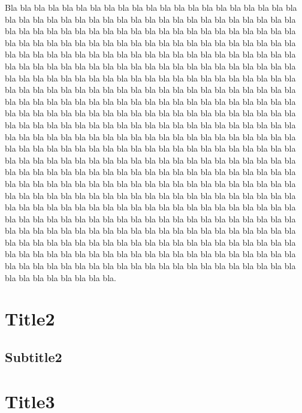 \documentclass{uimppracticas}
\begin{document}
Bla bla bla bla bla bla bla bla bla bla bla bla bla bla bla bla bla bla bla bla bla bla bla bla bla bla bla bla bla bla bla bla bla bla bla bla bla bla bla bla bla bla bla bla bla bla bla bla bla bla bla bla bla bla bla bla bla bla bla bla bla bla bla bla bla bla bla bla bla bla bla bla bla bla bla bla bla bla bla bla bla bla bla bla bla bla bla bla bla bla bla bla bla bla bla bla bla bla bla bla bla bla bla bla bla bla bla bla bla bla bla bla bla bla bla bla bla bla bla bla bla bla bla bla bla bla bla bla bla bla bla bla bla bla bla bla bla bla bla bla bla bla bla bla bla bla bla bla bla bla bla bla bla bla bla bla bla bla bla bla bla bla bla bla bla bla bla bla bla bla bla bla bla bla bla bla bla bla bla bla bla bla bla bla bla bla bla bla bla bla bla bla bla bla bla bla bla bla bla bla bla bla bla bla bla bla bla bla bla bla bla bla bla bla bla bla bla bla bla bla bla bla bla bla bla bla bla bla bla bla bla bla bla bla bla bla bla bla bla bla bla bla bla bla bla bla bla bla bla bla bla bla bla bla bla bla bla bla bla bla bla bla bla bla bla bla bla bla bla bla bla bla bla bla bla bla bla bla bla bla bla bla bla bla bla bla bla bla bla bla bla bla bla bla bla bla bla bla bla bla bla bla bla bla bla bla bla bla bla bla bla bla bla bla bla bla bla bla bla bla bla bla bla bla bla bla bla bla bla bla bla bla bla bla bla bla bla bla bla bla bla bla bla bla bla bla bla bla bla bla bla bla bla bla bla bla bla bla bla bla bla bla bla bla bla bla bla bla bla bla bla bla bla bla bla bla bla bla bla bla bla bla bla bla bla bla bla bla bla bla bla bla bla bla bla bla bla bla bla bla bla bla bla bla bla bla bla bla bla bla bla bla bla bla bla bla bla bla bla bla bla bla bla bla bla bla bla bla bla bla bla bla bla bla bla bla bla bla bla bla bla bla bla bla bla bla bla bla bla bla bla bla bla bla bla bla bla bla bla bla bla bla bla bla bla bla bla bla bla bla bla bla bla bla bla bla bla bla bla bla bla bla bla bla bla bla bla bla bla bla bla\cite{wiki:exo}.

\section{Title2}
\subsection{Subtitle2}


\section{Title3}
\end{document}

